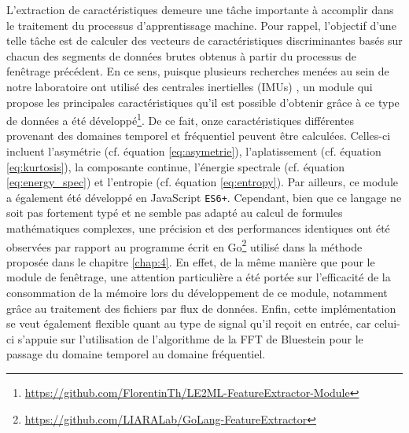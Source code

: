 L'extraction de caractéristiques demeure une tâche importante à accomplir dans le traitement du processus d'apprentissage machine. Pour rappel, l'objectif d'une telle tâche est de calculer des vecteurs de caractéristiques discriminantes basés sur chacun des segments de données brutes obtenus à partir du processus de fenêtrage précédent. En ce sens, puisque plusieurs recherches menées au sein de notre laboratoire ont utilisé des centrales inertielles (\acsp{IMU}) \citep{Thullier2017,Thullier2018,Chapron2018}, un module qui propose les principales caractéristiques qu'il est possible d'obtenir grâce à ce type de données a été développé\footnote{\url{https://github.com/FlorentinTh/LE2ML-FeatureExtractor-Module}}. De ce fait, onze caractéristiques différentes provenant des domaines temporel et fréquentiel peuvent être calculées. Celles-ci incluent l'asymétrie (cf. équation \ref{eq:asymetrie}), l'aplatissement (cf. équation \ref{eq:kurtosis}), la composante continue, l'énergie spectrale (cf. équation \ref{eq:energy_spec}) et l'entropie (cf. équation \ref{eq:entropy}). Par ailleurs, ce module a également été développé en JavaScript \texttt{ES6+}. Cependant, bien que ce langage ne soit pas fortement typé et ne semble pas adapté au calcul de formules mathématiques complexes, une précision et des performances identiques ont été observées par rapport au programme écrit en Go\footnote{\url{https://github.com/LIARALab/GoLang-FeatureExtractor}} utilisé dans la méthode proposée dans le chapitre \ref{chap:4}. En effet, de la même manière que pour le module de fenêtrage, une attention particulière a été portée sur l'efficacité de la consommation de la mémoire lors du développement de ce module, notamment grâce au traitement des fichiers par flux de données. Enfin, cette implémentation se veut également flexible quant au type de signal qu'il reçoit en entrée, car celui-ci s'appuie sur l'utilisation de l'algorithme de la \acs{FFT} de Bluestein \citep{Bluestein1970} pour le passage du domaine temporel au domaine fréquentiel.

